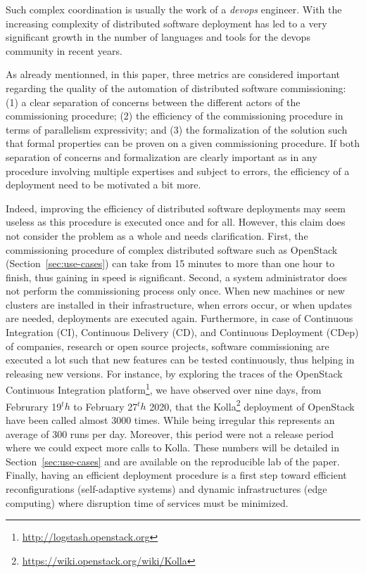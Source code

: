 %
Such complex coordination is usually the work of a \emph{devops} engineer. With the increasing complexity of distributed software deployment has led to a very significant growth in the number of languages and tools for the devops community in recent years.

As already mentionned, in this paper, three metrics are considered important regarding the quality of the automation of distributed software commissioning: (1) a clear separation of concerns between the different actors of the commissioning procedure; (2) the efficiency of the commissioning procedure in terms of parallelism expressivity; and (3) the formalization of the solution such that formal properties can be proven on a given commissioning procedure. If both separation of concerns and formalization are clearly important as in any procedure involving multiple expertises and subject to errors, the efficiency of a deployment need to be motivated a bit more.

Indeed, improving the efficiency of distributed software deployments may seem useless as this procedure is executed once and for all. However, this claim does not consider the problem as a whole and needs clarification. %
First, the commissioning procedure of complex distributed software such as OpenStack (Section~\ref{sec:use-cases}) can take from 15 minutes to more than
one hour to finish, thus gaining in speed is significant. Second, a system
administrator does not perform the commissioning process only once. When new
machines or new clusters are installed in their infrastructure, when errors
occur, or when updates are needed, deployments are executed again.
%
Furthermore, in case of Continuous Integration (CI), Continuous Delivery (CD), and Continuous Deployment (CDep) of companies, research or open source projects, software commissioning are executed a lot such that new features can be tested continuously, thus helping in releasing new versions. For instance, by exploring the traces of the OpenStack Continuous Integration platform\footnote{\url{http://logstash.openstack.org}}, we have observed over nine days, from Februrary 19$^th$ to February 27$^th$ 2020, that the Kolla\footnote{\url{https://wiki.openstack.org/wiki/Kolla}} deployment  of OpenStack have been called almost 3000 times. While being irregular this represents an average of 300 runs per day. Moreover, this period were not a release period where we could expect more calls to Kolla. These numbers will be detailed in Section~\ref{sec:use-cases} and are available on the reproducible lab of the paper.
%
Finally, having an efficient deployment procedure is a first step toward efficient reconfigurations (\eg self-adaptive systems) and dynamic infrastructures (\eg edge computing) where disruption time of services must be minimized.

